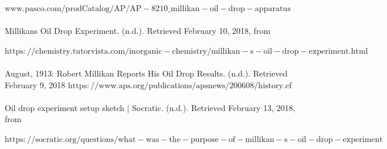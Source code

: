 \documentclass[]{article}
\begin{document}
\(\mathrm{www.pasco.com/prodCatalog/AP/AP-8210\_ millikan-oil-drop-apparatus}\)
\\ \\
Millikans Oil Drop Experiment. (n.d.). Retrieved February 10, 2018, from 

\(\mathrm{https://chemistry.tutorvista.com/inorganic-chemistry/millikan-s-oil-drop-experiment.html}\)
\\ \\
August, 1913: Robert Millikan Reports His Oil Drop Results. (n.d.). Retrieved February 9, 2018
\( \mathrm{https://www.aps.org/publications/apsnews/200608/history.cf  } \)
\\ \\
Oil drop experiment setup sketch | Socratic. (n.d.). Retrieved February 13, 2018, from 

\(\mathrm{https://socratic.org/questions/what-was-the-purpose-of-millikan-s-oil-drop-experiment}\)\\
\end{document}
